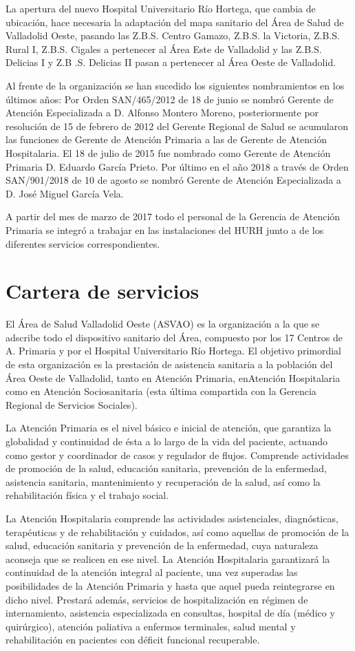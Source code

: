 La apertura del nuevo Hospital Universitario Río Hortega, que cambia de ubicación, hace necesaria la adaptación del mapa sanitario del Área de Salud de Valladolid Oeste, pasando las Z.B.S. Centro Gamazo, Z.B.S. la Victoria, Z.B.S. Rural I, Z.B.S. Cigales a pertenecer al Área Este de Valladolid y las Z.B.S. Delicias I y Z.B .S. Delicias II pasan a pertenecer al Área Oeste de Valladolid.

Al frente de la organización se han sucedido los siguientes nombramientos en los últimos años: Por Orden SAN/465/2012 de 18 de junio se nombró Gerente de Atención Especializada a D. Alfonso Montero Moreno, posteriormente por resolución de 15 de febrero de 2012 del Gerente Regional de Salud se acumularon las funciones de Gerente de Atención Primaria a las de Gerente de Atención Hospitalaria. El 18 de julio de 2015 fue nombrado como Gerente de Atención Primaria D. Eduardo García Prieto. Por último en el año 2018 a través de Orden SAN/901/2018 de 10 de agosto se nombró Gerente de Atención Especializada a D. José Miguel García Vela.

A partir del mes de marzo de 2017 todo el personal de la Gerencia de Atención Primaria se integró a trabajar en las instalaciones del HURH junto a de los diferentes servicios correspondientes.

\section{Cartera de servicios}

El Área de Salud Valladolid Oeste (ASVAO) es la organización a la que se adscribe todo el dispositivo sanitario del Área, compuesto por los 17 Centros de A. Primaria y por el Hospital Universitario Río Hortega. El objetivo primordial de esta organización es la prestación de asistencia sanitaria a la población del Área Oeste de Valladolid, tanto en Atención Primaria, enAtención Hospitalaria como en Atención Sociosanitaria (esta última compartida con la Gerencia Regional de Servicios Sociales).

La Atención Primaria es el nivel básico e inicial de atención, que garantiza la globalidad y continuidad de ésta a lo largo de la vida del paciente, actuando como gestor y coordinador de casos y regulador de flujos. Comprende actividades de promoción de la salud, educación sanitaria, prevención de la enfermedad, asistencia sanitaria, mantenimiento y recuperación de la salud, así como la rehabilitación física y el trabajo social.

La Atención Hospitalaria comprende las actividades asistenciales, diagnósticas, terapéuticas y de rehabilitación y cuidados, así como aquellas de promoción de la salud, educación sanitaria y prevención de la enfermedad, cuya naturaleza aconseja que se realicen en ese nivel. La Atención Hospitalaria garantizará la continuidad de la atención integral al paciente, una vez superadas las posibilidades de la Atención Primaria y hasta que aquel pueda reintegrarse en dicho nivel. Prestará además, servicios de hospitalización en régimen de internamiento, asistencia especializada en consultas, hospital de día (médico y quirúrgico), atención paliativa a enfermos terminales, salud mental y rehabilitación en pacientes con déficit funcional recuperable.

